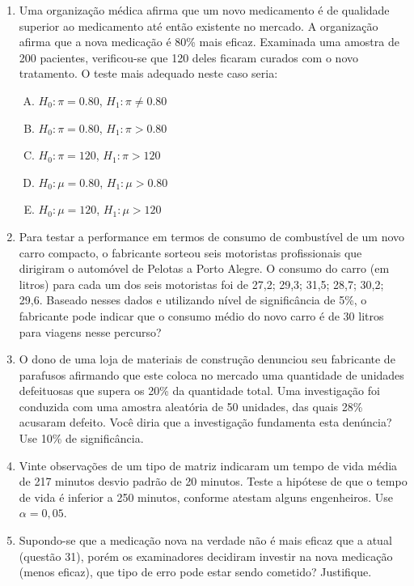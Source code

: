\documentclass[12pt, a4paper]{article}
\begin{document}
\begin{enumerate}
\item Uma organização médica afirma que um novo medicamento é de qualidade superior ao medicamento até então existente no mercado. A organização afirma que a nova medicação é 80\% mais eficaz. Examinada uma amostra de 200 pacientes, verificou-se que 120 deles ficaram curados com o novo tratamento. O teste mais adequado neste caso seria:
\begin{enumerate}[A)]
    \item $H_0: \pi = 0.80$, $H_1: \pi \neq 0.80$
    \item $H_0: \pi=0.80$, $H_1: \pi > 0.80$
    \item $H_0: \pi=120$, $H_1: \pi > 120$
    \item $H_0: \mu=0.80$, $H_1: \mu > 0.80$
    \item $H_0: \mu=120$, $H_1: \mu > 120$
\end{enumerate}

\item Para testar a performance em termos de consumo de combustível de um novo carro compacto, o fabricante sorteou seis motoristas profissionais que dirigiram o automóvel de Pelotas a Porto Alegre. O consumo do carro (em litros) para cada um dos seis motoristas foi de 27,2; 29,3; 31,5; 28,7; 30,2; 29,6. Baseado nesses dados e utilizando nível de significância de 5\%, o fabricante pode indicar que o consumo médio do novo carro é de 30 litros para viagens nesse percurso?

\item O dono de uma loja de materiais de construção denunciou seu fabricante de parafusos afirmando que este coloca no mercado uma quantidade de unidades defeituosas que supera os 20\% da quantidade total. Uma investigação foi conduzida com uma amostra aleatória de 50 unidades, das quais 28\% acusaram defeito. Você diria que a investigação fundamenta esta denúncia? Use 10\% de significância.

\item Vinte observações de um tipo de matriz indicaram um tempo de vida média de 217 minutos desvio padrão de 20 minutos. Teste a hipótese de que o tempo de vida é inferior a 250 minutos, conforme atestam alguns engenheiros. Use $\alpha=0,05$.

\item Supondo-se que a medicação nova na verdade não é mais eficaz que a atual (questão 31), porém os examinadores decidiram investir na nova medicação (menos eficaz), que tipo de erro pode estar sendo cometido? Justifique.


\end{enumerate}
\end{document}
